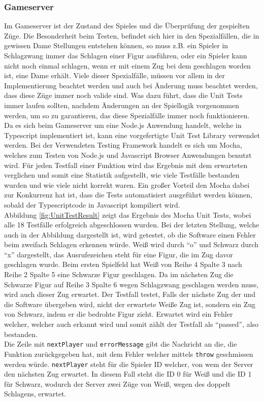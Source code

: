 \documentclass[12pt,a4paper,bibliography=totocnumbered,listof=totocnumbered]{article}
\begin{document}
\subsubsection{Gameserver}
Im Gameserver ist der Zustand des Spieles und die Überprüfung der gespielten Züge. 
Die Besonderheit beim Testen, befindet sich hier in den Spezialfällen, die in gewissen Dame Stellungen entstehen können, so muss z.B. ein
Spieler in Schlagzwang immer das Schlagen einer Figur ausführen, oder ein Spieler kann nicht noch einmal schlagen, wenn er mit einem Zug bei dem geschlagen worden ist,
eine Dame erhält. Viele dieser Spezialfälle, müssen vor allem in der Implementierung beachtet werden und auch bei Änderung muss beachtet werden, dass 
diese Züge immer noch valide sind. Was dazu führt, dass die Unit Tests immer laufen sollten, nachdem Änderungen an der Spiellogik vorgenommen werden,
um so zu garantieren, das diese Spezialfälle immer noch funktionieren.
\\
Da es sich beim Gameserver um eine Node.js Anwendung handelt, welche in Typescript implementiert ist, kann eine vorgefertigte Unit Test Library verwendet werden.
Bei der Verwendeten Testing Framework handelt es sich um Mocha, welches zum Testen von Node.js und Javascript Browser Anwendungen benutzt wird. 
Für jeden Testfall einer Funktion wird das Ergebnis mit dem erwarteten verglichen und somit eine Statistik aufgestellt, wie viele Testfälle 
bestanden wurden und wie viele nicht korrekt waren. Ein großer Vorteil den Mocha dabei zur Konkurrenz hat ist, dass die Tests automatisiert ausgeführt werden 
können, sobald der Typescriptcode in Javascript kompiliert wird.
\\ 
Abbildung \ref{fig:UnitTestResult} zeigt das Ergebnis des Mocha Unit Tests, wobei alle 18 Testfälle erfolgreich abgeschlossen wurden.
Bei der letzten Stellung, welche auch in der Abbildung dargestellt ist, wird getestet, ob die Software einen Fehler beim zweifach Schlagen erkennen würde.
Weiß wird durch ``o'' und Schwarz durch ``x'' dargestellt, das Ausrufezeichen steht für eine Figur, die im Zug davor geschlagen wurde. 
Beim ersten Spielfeld hat Weiß von Reihe 4 Spalte 3 nach Reihe 2 Spalte 5 eine Schwarze Figur geschlagen. Da im nächsten Zug die Schwarze Figur auf 
Reihe 3 Spalte 6 wegen Schlagzwang geschlagen werden muss, wird auch dieser Zug erwartet. Der Testfall testet, Falls der nächste Zug der 
und die Software übergeben wird, nicht der erwartete Weiße Zug ist, sondern ein Zug von Schwarz, indem er die bedrohte Figur zieht.
Erwartet wird ein Fehler welcher, welcher auch erkannt wird und somit zählt der Testfall als ``passed'', also bestanden.
\\
Die Zeile mit \texttt{nextPlayer} und \texttt{errorMessage} gibt die Nachricht an die, die Funktion zurückgegeben hat, mit dem Fehler welcher
mittels \texttt{throw} geschmissen werden würde. \texttt{nextPlayer} steht für die Spieler ID welcher, von wem der Server den nächsten Zug erwartet.
In diesem Fall steht die ID 0 für Weiß und die ID 1 für Schwarz, wodurch der Server zwei Züge von Weiß, wegen des doppelt Schlagens, erwartet.
\end{document}
